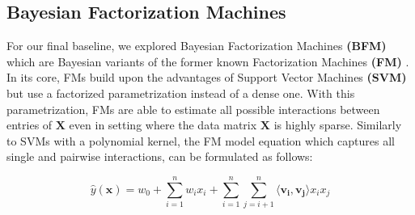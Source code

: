 \documentclass[10pt,conference,compsocconf]{IEEEtran}
\begin{document}
    \subsection{Bayesian Factorization Machines}
    For our final baseline, we explored Bayesian Factorization Machines \textbf{(BFM)} which are Bayesian variants of the former known Factorization Machines \textbf{(FM)} \cite{rendle_factorization_2010}.
    In its core, FMs build upon the advantages of Support Vector Machines \textbf{(SVM)} but use a factorized parametrization instead of a dense one.
    With this parametrization, FMs are able to estimate all possible interactions between entries of $\mathbf{X}$ even in setting where the data matrix $\mathbf{X}$ is highly sparse.
    Similarly to SVMs with a polynomial kernel, the FM model equation which captures all single and pairwise interactions, can be formulated as follows:

    $$\hat{y}(\mathbf{x})=w_0+\sum^n_{i=1}w_ix_i + \sum^n_{i=1}\sum^n_{j=i+1}\langle \mathbf{v_i},\mathbf{v_j} \rangle x_ix_j$$
\end{document}
